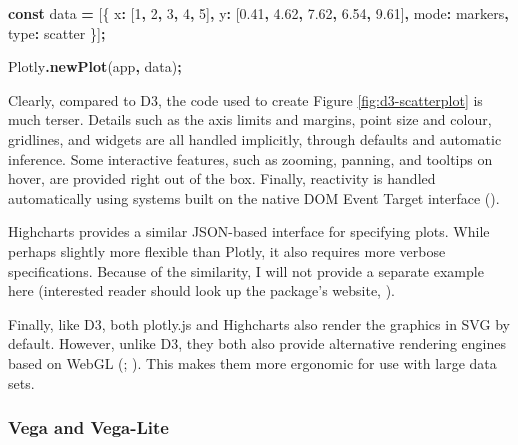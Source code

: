 \documentclass[
  openany]{book}
\newenvironment{Shaded}{\begin{snugshade}}{\end{snugshade}}
\newcommand{\DataTypeTok}[1]{\textcolor[rgb]{0.13,0.29,0.53}{#1}}
\newcommand{\DecValTok}[1]{\textcolor[rgb]{0.00,0.00,0.81}{#1}}
\newcommand{\FloatTok}[1]{\textcolor[rgb]{0.00,0.00,0.81}{#1}}
\newcommand{\FunctionTok}[1]{\textcolor[rgb]{0.13,0.29,0.53}{\textbf{#1}}}
\newcommand{\KeywordTok}[1]{\textcolor[rgb]{0.13,0.29,0.53}{\textbf{#1}}}
\newcommand{\NormalTok}[1]{#1}
\newcommand{\OperatorTok}[1]{\textcolor[rgb]{0.81,0.36,0.00}{\textbf{#1}}}
\newcommand{\StringTok}[1]{\textcolor[rgb]{0.31,0.60,0.02}{#1}}
\theoremstyle{definition}
\theoremstyle{definition}
\theoremstyle{definition}
\theoremstyle{definition}
\theoremstyle{remark}
\begin{document}
\begin{Shaded}
\begin{Highlighting}[]
\KeywordTok{const}\NormalTok{ data }\OperatorTok{=}\NormalTok{ [\{}
  \DataTypeTok{x}\OperatorTok{:}\NormalTok{ [}\DecValTok{1}\OperatorTok{,} \DecValTok{2}\OperatorTok{,} \DecValTok{3}\OperatorTok{,} \DecValTok{4}\OperatorTok{,} \DecValTok{5}\NormalTok{]}\OperatorTok{,}
  \DataTypeTok{y}\OperatorTok{:}\NormalTok{ [}\FloatTok{0.41}\OperatorTok{,} \FloatTok{4.62}\OperatorTok{,} \FloatTok{7.62}\OperatorTok{,} \FloatTok{6.54}\OperatorTok{,} \FloatTok{9.61}\NormalTok{]}\OperatorTok{,}
  \DataTypeTok{mode}\OperatorTok{:} \StringTok{\textquotesingle{}markers\textquotesingle{}}\OperatorTok{,}
  \DataTypeTok{type}\OperatorTok{:} \StringTok{\textquotesingle{}scatter\textquotesingle{}}
\NormalTok{\}]}\OperatorTok{;}

\NormalTok{Plotly}\OperatorTok{.}\FunctionTok{newPlot}\NormalTok{(}\StringTok{\textquotesingle{}app\textquotesingle{}}\OperatorTok{,}\NormalTok{ data)}\OperatorTok{;}
\end{Highlighting}
\end{Shaded}

Clearly, compared to D3, the code used to create Figure \ref{fig:d3-scatterplot} is much terser. Details such as the axis limits and margins, point size and colour, gridlines, and widgets are all handled implicitly, through defaults and automatic inference. Some interactive features, such as zooming, panning, and tooltips on hover, are provided right out of the box. Finally, reactivity is handled automatically using systems built on the native DOM Event Target interface ().

Highcharts provides a similar JSON-based interface for specifying plots. While perhaps slightly more flexible than Plotly, it also requires more verbose specifications. Because of the similarity, I will not provide a separate example here (interested reader should look up the package's website, ).

Finally, like D3, both plotly.js and Highcharts also render the graphics in SVG by default. However, unlike D3, they both also provide alternative rendering engines based on WebGL (; ). This makes them more ergonomic for use with large data sets.

\subsubsection{Vega and Vega-Lite}\label{vega-and-vega-lite}
\end{document}
